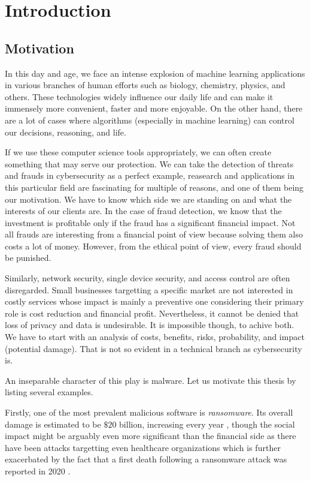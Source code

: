 \chapter{Introduction} \label{chap:intro}
\section*{Motivation}
In this day and age, we face an intense explosion of machine learning applications in various branches of human efforts such as biology, chemistry, physics, and others. These technologies widely influence our daily life and can make it immensely more convenient, faster and more enjoyable. On the other hand, there are a lot of cases where algorithms (especially in machine learning) can control our decisions, reasoning, and life.

If we use these computer science tools appropriately, we can often create something that may serve our protection. We can take the detection of threats and frauds in cybersecurity as a perfect example, reasearch and applications in this particular field are fascinating for multiple of reasons, and one of them being our motivation. We have to know which side we are standing on and what the interests of our clients are. In the case of fraud detection, we know that the investment is profitable only if the fraud has a significant financial impact. Not all frauds are interesting from a financial point of view because solving them also costs a lot of money. However, from the ethical point of view, every fraud should be punished. 

Similarly, network security, single device security, and access control are often disregarded. Small businesses targetting a specific market are not interested in costly services whose impact is mainly a preventive one considering their primary role is cost reduction and financial profit. Nevertheless, it cannot be denied that loss of privacy and data is undesirable. It is impossible though, to achive both. We have to start with an analysis of costs, benefits, risks, probability, and impact (potential damage). That is not so evident in a technical branch as cybersecurity is.

An inseparable character of this play is malware. Let us motivate this thesis by listing several examples.

Firstly, one of the most prevalent malicious software is \emph{ransomware}. Its overall damage is estimated to be $\$20$ billion, increasing every year \cite{purplesec2021}, though the social impact might be arguably even more significant than the financial side as there have been attacks targetting even healthcare organizations which is further exacerbated by the fact that a first death following a ransomware attack was reported in 2020 \cite{Cimpanu2020}.


